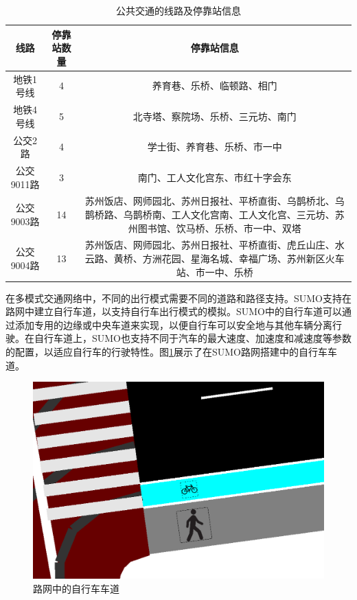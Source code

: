 \renewcommand{\arraystretch}{1.2} %
\begin{table}[htbp]
\centering
\caption{公共交通的线路及停靠站信息}
\label{public_inf}
\begin{tabular}{ccc}
\toprule
线路 & 停靠站数量  & 停靠站信息      \\
\midrule
地铁1号线           & 4            & \parbox[t]{8.5cm}{养育巷、乐桥、临顿路、相门}                        \\
地铁4号线           & 5           & \parbox[t]{8.5cm}{北寺塔、察院场、乐桥、三元坊、南门}                 \\ 
公交2路             & 4       & \parbox[t]{8.5cm}{学士街、养育巷、乐桥、市一中}                \\
公交9011路             & 3      & \parbox[t]{8.5cm}{南门、工人文化宫东、市红十字会东}                \\
公交9003路             & 14       & \parbox[t]{8.5cm}{苏州饭店、网师园北、苏州日报社、平桥直街、乌鹊桥北、乌鹊桥路、乌鹊桥南、工人文化宫南、工人文化宫、三元坊、苏州图书馆、饮马桥、乐桥、市一中、双塔}                \\
公交9004路             & 13       & \parbox[t]{8.5cm}{苏州饭店、网师园北、苏州日报社、平桥直街、虎丘山庄、水云路、黄桥、方洲花园、星海名城、幸福广场、苏州新区火车站、市一中、乐桥}                \\
\bottomrule
\end{tabular}
\end{table}

在多模式交通网络中，不同的出行模式需要不同的道路和路径支持。SUMO支持在路网中建立自行车道，以支持自行车出行模式的模拟。SUMO中的自行车道可以通过添加专用的边缘或中央车道来实现，以便自行车可以安全地与其他车辆分离行驶。在自行车道上，SUMO也支持不同于汽车的最大速度、加速度和减速度等参数的配置，以适应自行车的行驶特性。图\ref{sumobike}展示了在SUMO路网搭建中的自行车车道。

\begin{figure}[H]
  \centering
  \includegraphics[width=.4\linewidth]{figures/content/bike.png}
  \caption{路网中的自行车车道}
  \label{sumobike}
\end{figure}

